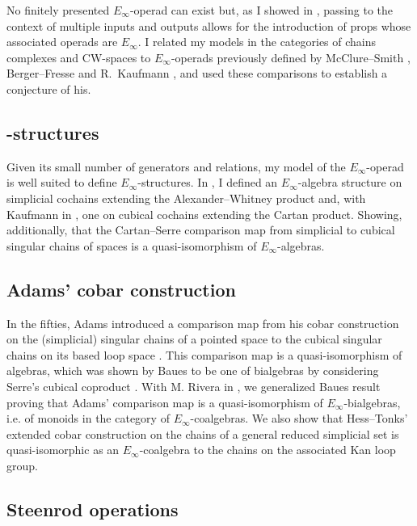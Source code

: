 No finitely presented $E_\infty$-operad can exist but, as I showed in \cite{medina2020prop1, medina2018prop2}, passing to the context of multiple inputs and outputs allows for the introduction of props whose associated operads are $E_\infty$.
I related my models in the categories of chains complexes and CW-spaces to $E_\infty$-operads previously defined by McClure--Smith \cite{mcclure2003multivariable}, Berger--Fresse \cite{berger2004combinatorial} and R.~Kaufmann \cite{kaufmann2009dimension}, and used these comparisons to establish a conjecture of his.

\subsection{\pdfEinfty-structures} \label{ss:e-infty structures}

Given its small number of generators and relations, my model of the $E_\infty$-operad is well suited to define $E_{\infty}$-structures.
In \cite{medina2020prop1}, I defined an $E_\infty$-algebra structure on simplicial cochains extending the Alexander--Whitney product and, with Kaufmann in \cite{medina2021cubical}, one on cubical cochains extending the Cartan product.
Showing, additionally, that the Cartan--Serre comparison map from simplicial to cubical singular chains of spaces is a quasi-isomorphism of $E_\infty$-algebras.

\subsection{Adams' cobar construction}

In the fifties, Adams introduced a comparison map from his cobar construction on the (simplicial) singular chains of a pointed space to the cubical singular chains on its based loop space \cite{adams1956cobar}.
This comparison map is a quasi-isomorphism of algebras, which was shown by Baues to be one of bialgebras by considering Serre's cubical coproduct \cite{baues1998hopf}.
With M. Rivera in \cite{medina2021cobar}, we generalized Baues result proving that Adams' comparison map is a quasi-isomorphism of $E_{\infty}$-bialgebras, i.e. of monoids in the category of $E_{\infty}$-coalgebras.
We also show that Hess--Tonks' extended cobar construction \cite{hess2010cobar} on the chains of a general reduced simplicial set is quasi-isomorphic as an $E_{\infty}$-coalgebra to the chains on the associated Kan loop group.

\subsection{Steenrod operations} \label{ss:may steenrod}

